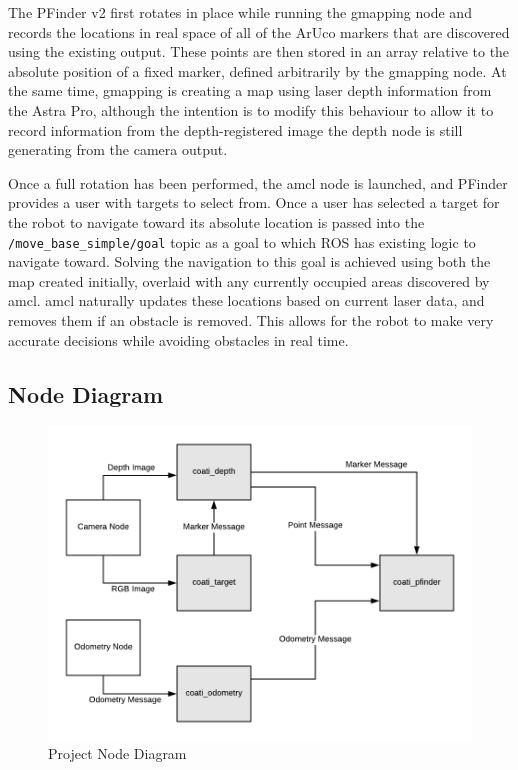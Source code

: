 \documentclass{article}[12]
\begin{document}
	The PFinder v2 first rotates in place while running the gmapping node and records the locations in real space of all of the ArUco markers that are discovered using the existing output. These points are then stored in an array relative to the absolute position of a fixed marker, defined arbitrarily by the gmapping node. At the same time, gmapping is creating a map using laser depth information from the Astra Pro, although the intention is to modify this behaviour to allow it to record information from the depth-registered image the depth node is still generating from the camera output.
	
	Once a full rotation has been performed, the amcl node is launched, and PFinder provides a user with targets to select from. Once a user has selected a target for the robot to navigate toward its absolute location is passed into the \texttt{/move\_base\_simple/goal} topic as a goal to which ROS has existing logic to navigate toward. Solving the navigation to this goal is achieved using both the map created initially, overlaid with any currently occupied areas discovered by amcl. amcl naturally updates these locations based on current laser data, and removes them if an obstacle is removed. This allows for the robot to make very accurate decisions while avoiding obstacles in real time. 
	
	\subsection{Node Diagram}

	\begin{figure}[H]
		\centering
		\includegraphics[width=0.8\linewidth]{NodeDiagram}
		\caption{Project Node Diagram}
		\label{fig:nodediagram}
	\end{figure}
\end{document}
